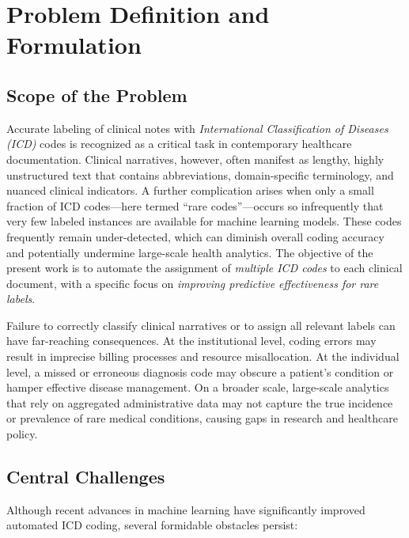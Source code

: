 \chapter{Problem Definition and Formulation}
\label{chap:problemdefinition}

\section{Scope of the Problem}
Accurate labeling of clinical notes with \emph{International Classification of Diseases (ICD)} codes is recognized as a critical task in contemporary healthcare documentation. Clinical narratives, however, often manifest as lengthy, highly unstructured text that contains abbreviations, domain-specific terminology, and nuanced clinical indicators. A further complication arises when only a small fraction of ICD codes—here termed ``rare codes''—occurs so infrequently that very few labeled instances are available for machine learning models. These codes frequently remain under-detected, which can diminish overall coding accuracy and potentially undermine large-scale health analytics. The objective of the present work is to automate the assignment of \emph{multiple ICD codes} to each clinical document, with a specific focus on \emph{improving predictive effectiveness for rare labels}.

Failure to correctly classify clinical narratives or to assign all relevant labels can have far-reaching consequences. At the institutional level, coding errors may result in imprecise billing processes and resource misallocation. At the individual level, a missed or erroneous diagnosis code may obscure a patient’s condition or hamper effective disease management. On a broader scale, large-scale analytics that rely on aggregated administrative data may not capture the true incidence or prevalence of rare medical conditions, causing gaps in research and healthcare policy.

\section{Central Challenges}
Although recent advances in machine learning have significantly improved automated ICD coding, several formidable obstacles persist:

